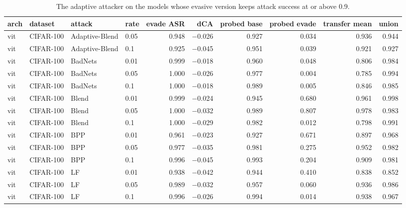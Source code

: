 \begin{table}[htbp]
\centering
\small
\caption{The adaptive attacker on the models whose evasive version keeps attack success at or above 0.9.}
\label{tab:adaptive-attacker}
\begin{adjustbox}{max width=\linewidth}
\begin{tabular}{llllrrrrrr}
\toprule
arch & dataset & attack & rate & evade ASR & dCA & probed base & probed evade & transfer mean & union \\
\midrule
vit & CIFAR-100 & Adaptive-Blend & 0.05 & 0.948 & $-$0.026 & 0.927 & 0.034 & 0.936 & 0.944 \\
vit & CIFAR-100 & Adaptive-Blend & 0.1 & 0.925 & $-$0.045 & 0.951 & 0.039 & 0.921 & 0.927 \\
vit & CIFAR-100 & BadNets & 0.01 & 0.999 & $-$0.018 & 0.960 & 0.048 & 0.806 & 0.984 \\
vit & CIFAR-100 & BadNets & 0.05 & 1.000 & $-$0.026 & 0.977 & 0.004 & 0.785 & 0.994 \\
vit & CIFAR-100 & BadNets & 0.1 & 1.000 & $-$0.018 & 0.989 & 0.005 & 0.846 & 0.985 \\
vit & CIFAR-100 & Blend & 0.01 & 0.999 & $-$0.024 & 0.945 & 0.680 & 0.961 & 0.998 \\
vit & CIFAR-100 & Blend & 0.05 & 1.000 & $-$0.032 & 0.989 & 0.807 & 0.978 & 0.983 \\
vit & CIFAR-100 & Blend & 0.1 & 1.000 & $-$0.029 & 0.982 & 0.012 & 0.798 & 0.991 \\
vit & CIFAR-100 & BPP & 0.01 & 0.961 & $-$0.023 & 0.927 & 0.671 & 0.897 & 0.968 \\
vit & CIFAR-100 & BPP & 0.05 & 0.977 & $-$0.035 & 0.981 & 0.275 & 0.952 & 0.982 \\
vit & CIFAR-100 & BPP & 0.1 & 0.996 & $-$0.045 & 0.993 & 0.204 & 0.909 & 0.981 \\
vit & CIFAR-100 & LF & 0.01 & 0.938 & $-$0.042 & 0.944 & 0.410 & 0.838 & 0.852 \\
vit & CIFAR-100 & LF & 0.05 & 0.989 & $-$0.032 & 0.957 & 0.060 & 0.936 & 0.986 \\
vit & CIFAR-100 & LF & 0.1 & 0.996 & $-$0.026 & 0.994 & 0.014 & 0.938 & 0.967 \\
\bottomrule
\end{tabular}
\end{adjustbox}
\end{table}
